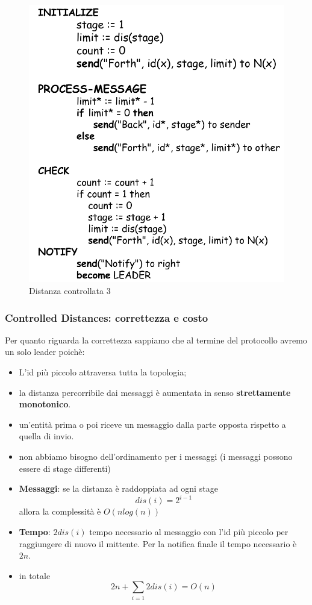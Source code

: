 \documentclass[12pt]{article}
\begin{document}
			\begin{figure}[h!]
				\centering
				\includegraphics[scale=0.30]{img/con3.png}
				\caption{Distanza controllata 3}
			\end{figure}
			
		\subsubsection{Controlled Distances: correttezza e costo}
			Per quanto riguarda la correttezza sappiamo che al termine del protocollo avremo un solo leader poichè:
			\begin{itemize}
				\item L'id più piccolo attraversa tutta la topologia;
				\item la distanza percorribile dai messaggi è aumentata in senso \textbf{strettamente monotonico}.
				\item un'entità prima o poi riceve un messaggio dalla parte opposta rispetto a quella di invio. 
				\item non abbiamo bisogno dell'ordinamento per i messaggi (i messaggi possono essere di stage differenti)
			\end{itemize}
			\begin{itemize}
				\item \textbf{Messaggi}: se la distanza è raddoppiata ad ogni stage $$dis(i) =2^{i-1}$$ allora la complessità è $O(nlog(n))$ 
				\item \textbf{Tempo}: $2dis(i)$ tempo necessario al messaggio con l'id più piccolo per raggiungere di nuovo il mittente. Per la notifica finale il tempo necessario è $2n$.
				\item in totale $$2n+\sum_{i=1}2dis(i) = O(n) $$ 
			\end{itemize}
		
\end{document}

